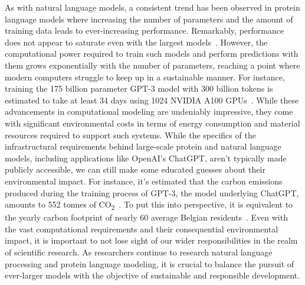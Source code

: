 As with natural language models, a consistent trend has been observed in protein language models where increasing the number of parameters and the amount of training data leads to ever-increasing performance. Remarkably, performance does not appear to saturate even with the largest models~\cite{Ofer}. However, the computational power required to train such models and perform predictions with them grows exponentially with the number of parameters, reaching a point where modern computers struggle to keep up in a sustainable manner. For instance, training the 175 billion parameter GPT-3 model with 300 billion tokens is estimated to take at least 34 days using 1024 NVIDIA A100 GPUs~\cite{gptrain}. While these advancements in computational modeling are undeniably impressive, they come with significant environmental costs in terms of energy consumption and material resources required to support such systems. While the specifics of the infrastructural requirements behind large-scale protein and natural language models, including applications like OpenAI's ChatGPT, aren't typically made publicly accessible, we can still make some educated guesses about their environmental impact. For instance, it's estimated that the carbon emissions produced during the training process of GPT-3, the model underlying ChatGPT, amounts to 552 tonnes of CO\textsubscript{2}~\cite{co2}. To put this into perspective, it is equivalent to the yearly carbon footprint of nearly 60 average Belgian residents~\cite{ghg}. Even with the vast computational requirements and their consequential environmental impact, it is important to not lose sight of our wider responsibilities in the realm of scientific research. As researchers continue to research natural language processing and protein language modeling, it is crucial to balance the pursuit of ever-larger models with the objective of sustainable and responsible development.